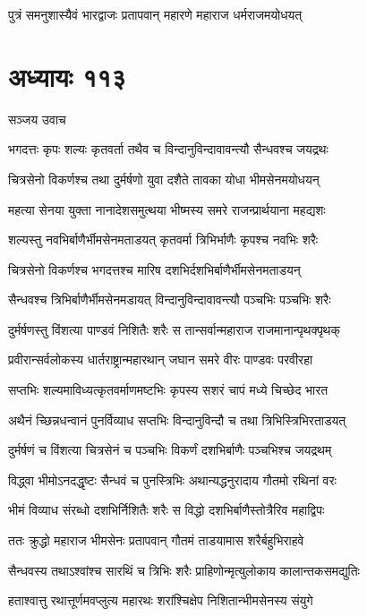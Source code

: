\twolineshloka
{पुत्रं समनुशास्यैवं भारद्वाजः प्रतापवान्}
{महारणे महाराज धर्मराजमयोधयत्}


\chapter{अध्यायः ११३}
\twolineshloka
{सञ्जय उवाच}
{}


\twolineshloka
{भगदत्तः कृपः शल्यः कृतवर्ता तथैव च}
{विन्दानुविन्दावावन्त्यौ सैन्धवश्च जयद्रथः}


\twolineshloka
{चित्रसेनो विकर्णश्च तथा दुर्मर्षणो युवा}
{दशैते तावका योधा भीमसेनमयोधयन्}


\twolineshloka
{महत्या सेनया युक्ता नानादेशसमुत्थया}
{भीष्मस्य समरे राजन्प्रार्थयाना महद्यशः}


\twolineshloka
{शल्यस्तु नवभिर्बाणैर्भीमसेनमताडयत्}
{कृतवर्मा त्रिभिर्भाणैः कृपश्च नवभिः शरैः}


\twolineshloka
{चित्रसेनो विकर्णश्च भगदत्तश्च मारिष}
{दशभिर्दशभिर्बाणैर्भीमसेनमताडयन्}


\twolineshloka
{सैन्धवश्च त्रिभिर्बाणैर्भीमसेनमडायत्}
{विन्दानुविन्दावावन्त्यौ पञ्चभिः पञ्चभिः शरैः}


\twolineshloka
{दुर्मर्षणस्तु विंशत्या पाण्डवं निशितैः शरैः}
{स तान्सर्वान्महाराज राजमानान्पृथक्पृथक्}


\twolineshloka
{प्रवीरान्सर्वलोकस्य धार्तराष्ट्रान्महारथान्}
{जघान समरे वीरः पाण्डवः परवीरहा}


\twolineshloka
{सप्तभिः शल्यमाविध्यत्कृतवर्माणमष्टभिः}
{कृपस्य सशरं चापं मध्ये चिच्छेद भारत}


\twolineshloka
{अथैनं च्छिन्नधन्वानं पुनर्विव्याध सप्तभिः}
{विन्दानुविन्दौ च तथा त्रिभिस्त्रिभिरताडयत्}


\twolineshloka
{दुर्मर्षणं च विंशत्या चित्रसेनं च पञ्चभिः}
{विकर्णं दशभिर्बाणैः पञ्चभिश्च जयद्रथम्}


\twolineshloka
{विद्ध्वा भीमोऽनदद्धृष्टः सैन्धवं च पुनस्त्रिभिः}
{अथान्यद्धनुरादाय गौतमो रथिनां वरः}


\twolineshloka
{भीमं विव्याध संरब्धो दशभिर्निशितैः शरैः}
{स विद्धो दशभिर्बाणैस्तोत्रैरिव महाद्विपः}


\twolineshloka
{ततः क्रुद्धो महाराज भीमसेनः प्रतापवान्}
{गौतमं ताडयामास शरैर्बहुभिराहवे}


\twolineshloka
{सैन्धवस्य तथाऽश्वांश्च सारथिं च त्रिभिः शरैः}
{प्राहिणोन्मृत्युलोकाय कालान्तकसमद्युतिः}


\twolineshloka
{हताश्वात्तु रथात्तूर्णमवप्लुत्य महारथः}
{शरांश्चिक्षेप निशितान्भीमसेनस्य संयुगे}


